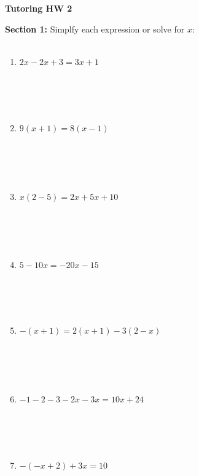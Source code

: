 \documentclass{article}
\begin{document}
\begin{center}
    \Large \textbf{Tutoring HW 2} \\
    \vspace{0.2cm}

\end{center}
\noindent
\textbf{Section 1:}
Simplfy each expression or solve for $x$:\\\\
\begin{minipage}[t]{0.45\textwidth}
    \begin{enumerate}
        \item $ 2x - 2x + 3 = 3 x + 1 $
        \\\\\\\\\\
        \item $ 9(x+1) = 8(x-1)$
        \\\\\\\\\\
        \item $ x(2-5) = 2x + 5x + 10 $
        \\\\\\\\\\
        \item $ 5 - 10x = -20x - 15$
        \\\\\\\\\\
        \item $ -(x+1) = 2(x+1) - 3(2-x)$
        \\\\\\\\\\
        \item $ -1 -2 -3 - 2x - 3x = 10x + 24$
        \\\\\\\\\\
        \item $ -(-x + 2) + 3x = 10$
        
    \end{enumerate}
\end{minipage}%
\end{document}
